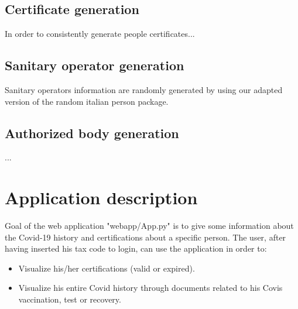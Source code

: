\documentclass{article}
\begin{document}
\subsection{Certificate generation}
In order to consistently generate people certificates...

\subsection{Sanitary operator generation}
Sanitary operators information are randomly generated by using our adapted version of the random italian person package.

\subsection{Authorized body generation}
...


\newpage
\section{Application description}
Goal of the web application {\selectfont"webapp/App.py"} is to give some information about the Covid-19 history and certifications about a specific person.
The user, after having inserted his tax code to login, can use the application in order to:
\begin{itemize}
    \item Visualize his/her certifications (valid or expired).
    \item Visualize his entire Covid history through documents related to his Covis vaccination, test or recovery.
\end{itemize}


\newpage
\end{document}

